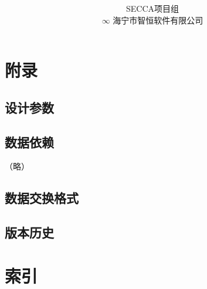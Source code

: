 \documentclass[hyperref, oneside]{book}
\title {\modtitle \\ \modsubtitle}
\author{SECCA项目组 \\ $\infty$ \small{海宁市智恒软件有限公司}}
\makeatletter
\newcommand\Fyes{$\bigcirc$}
\newcommand\Fno{$\times$}
\newcommand\makefeaturetable{
    \begin{table} \caption{数据特性} \centering
    \pgfplotstabletypeset[
        begin table=\begin{longtable},
        end table=\end{longtable},
        alias/访问控制/.initial=2,
        alias/缓存/.initial=5,
        alias/审核支持/.initial=5,
        alias/会计对象/.initial=5,
        alias/工资采集/.initial=5,
        columns={ 0, 1, 2, 3, 访问控制, 缓存, 4, 审核支持, 会计对象, 工资采集 },
        columns/0/.style={ column name={}, column type=r|, string type },
        columns/1/.style={ column name={对象}, string type },
        columns/2/.style={ column name={类型}, string type,
                string replace={E}{关系},
                string replace={C}{系统},
                string replace={Dict}{目录},
                string replace={UI}{实体},
                string replace={Tree}{结点},
                string replace={Process}{过程},
                string replace={MomentInterval}{记录},
                string replace={Ext}{高级},
                },
        columns/3/.style={ column name={设计规模}, column type=r, std=0:6 },
        columns/4/.style={ column name={预置数据}, string type,
            preproc cell content/.code={
                \pgfkeyssetvalue{/pgfplots/table/@cell content}{
                    ###1
                }}},
        columns/访问控制/.style={ string type,
            preproc cell content/.code={
                \pgfkeyssetvalue{/pgfplots/table/@cell content}{
                    \IfStrEqCase{###1}{
                        {E}{\Fno}
                        {Pool}{\Fno}}[\Fyes]
                }}},
        columns/缓存/.style={ string type,
            preproc cell content/.code={
                \pgfkeyssetvalue{/pgfplots/table/@cell content}{
                    \IfSubStr{###1}{C}{\Fyes}{\Fno}
                }}},
        columns/审核支持/.style={ string type,
            preproc cell content/.code={
                \pgfkeyssetvalue{/pgfplots/table/@cell content}{
                    \IfSubStr{###1}{V}{\Fyes}{\Fno}
                }}},
        columns/会计对象/.style={ string type,
            preproc cell content/.code={
                \pgfkeyssetvalue{/pgfplots/table/@cell content}{
                    \IfSubStr{###1}{A}{\Fyes}{\Fno}
                }}},
        columns/工资采集/.style={ string type,
            preproc cell content/.code={
                \pgfkeyssetvalue{/pgfplots/table/@cell content}{
                    \IfSubStr{###1}{S}{\Fyes}{\Fno}
                }}},
        every head row/.style={ before row=\toprule, after row=\midrule },
        every last row/.style={ after row=\bottomrule },
        col sep=comma, header=false
        ]{matrix.csv}
    \end{table}
}
\makeatother
\begin{document}
\renewcommand*\sectionmark[1]{\markright{\thesection. #1}}
\renewcommand*\thesection{\arabic{section}}

\maketitle

\renewcommand\contentsname{目录/Contents}
\tableofcontents
\clearpage



\section{附录}

    \subsection{设计参数}
        \begin{landscape}
            \makefeaturetable
        \end{landscape}

    \subsection{数据依赖}
        （略）

    \subsection{数据交换格式}
        

    \subsection{版本历史}
        

\section{索引}

    \listoftables
    \listoffigures
\end{document}

